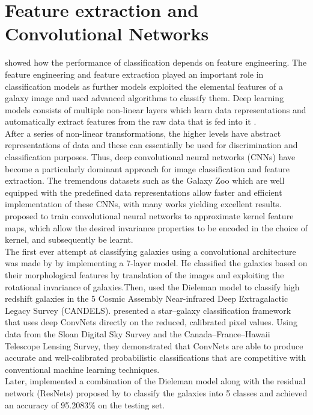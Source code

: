 \documentclass[a4paper,12pt]{report}
\begin{document}
\section{Feature extraction and Convolutional Networks}
\hspace*{0.5 in}\cite{Lecun2015} showed how the performance of classification depends on feature engineering. The feature engineering and feature extraction played an important role in classification models as further models exploited the elemental features of a galaxy image and used advanced algorithms to classify them. Deep learning models consists of multiple non-linear layers which learn data representations and automatically extract features from the raw data that is fed into it \citep{Bengio2013,Lecun2015}.\\
\hspace*{0.5 in}After a series of non-linear transformations, the higher levels have abstract representations of data and these can essentially be used for discrimination and classification purposes. Thus, deep convolutional neural networks (CNNs) have become a particularly dominant approach for image classification and feature extraction. The tremendous datasets such as the Galaxy Zoo which are well equipped with the predefined data representations allow faster and efficient implementation of these CNNs, with many works yielding excellent results.\\
\hspace*{0.5 in}\cite{Mairal2014} proposed to train convolutional neural networks to approximate kernel feature maps, which allow the desired invariance properties to be encoded in the choice of kernel, and subsequently be learnt.\\
\hspace*{0.5 in}The first ever attempt at classifying galaxies using a convolutional architecture was made by \cite{Dieleman2015} by implementing a 7-layer model. He classified the galaxies based on their morphological features by translation of the images and exploiting the rotational invariance of galaxies.Then, \cite{Huertas-Company_2011} used the Dieleman model to classify high redshift galaxies in the 5 Cosmic Assembly Near-infrared Deep Extragalactic Legacy Survey (CANDELS). \cite{Kim&Brunner} presented a star–galaxy classification framework that uses deep ConvNets directly on the reduced, calibrated pixel values. Using data from the Sloan Digital Sky Survey and the Canada–France–Hawaii Telescope Lensing Survey, they demonstrated that ConvNets are able to produce accurate and well-calibrated probabilistic classifications that are competitive with conventional machine learning techniques.\\
\hspace*{0.5 in}Later, \cite{dai2018galaxy} implemented a combination of the Dieleman model along with the residual network (ResNets) proposed by \cite{He_2016} to classify the galaxies into 5 classes and achieved an accuracy of 95.2083\% on the testing set.
\end{document}
